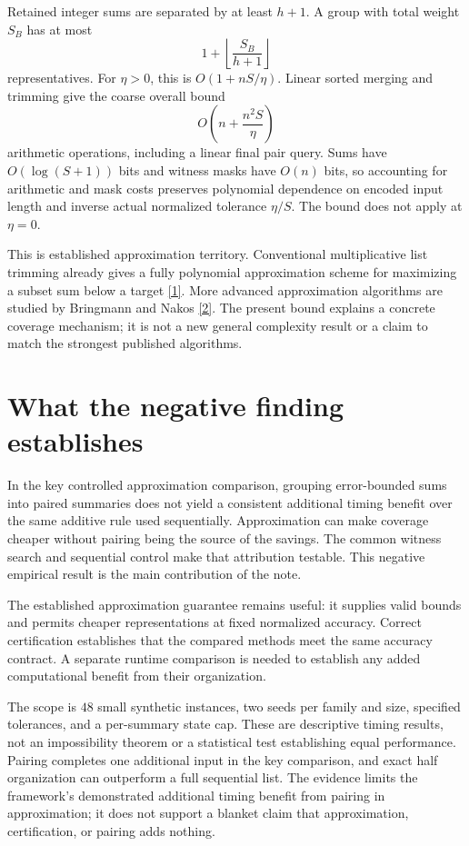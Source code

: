 \documentclass[10pt,english]{article}
\begin{document}
Retained integer sums are separated by at least \(h+1\). A group with total weight \(S_B\) has at most
\[
1+\left\lfloor\frac{S_B}{h+1}\right\rfloor
\]
representatives. For \(\eta>0\), this is \(O(1+nS/\eta)\). Linear sorted merging and trimming give the coarse overall bound
\[
O\!\left(n+\frac{n^2S}{\eta}\right)
\]
arithmetic operations, including a linear final pair query. Sums have \(O(\log(S+1))\) bits and witness masks have \(O(n)\) bits, so accounting for arithmetic and mask costs preserves polynomial dependence on encoded input length and inverse actual normalized tolerance \(\eta/S\). The bound does not apply at \(\eta=0\).

This is established approximation territory. Conventional multiplicative list trimming already gives a fully polynomial approximation scheme for maximizing a subset sum below a target \href{https://courses.grainger.illinois.edu/cs473/fa2015/w/lec/slides/10_notes.pdf}{[1]}. More advanced approximation algorithms are studied by Bringmann and Nakos \href{https://arxiv.org/abs/1912.12529}{[2]}. The present bound explains a concrete coverage mechanism; it is not a new general complexity result or a claim to match the strongest published algorithms.

\section{What the negative finding establishes}
In the key controlled approximation comparison, grouping error-bounded sums into paired summaries does not yield a consistent additional timing benefit over the same additive rule used sequentially. Approximation can make coverage cheaper without pairing being the source of the savings. The common witness search and sequential control make that attribution testable. This negative empirical result is the main contribution of the note.

The established approximation guarantee remains useful: it supplies valid bounds and permits cheaper representations at fixed normalized accuracy. Correct certification establishes that the compared methods meet the same accuracy contract. A separate runtime comparison is needed to establish any added computational benefit from their organization.

The scope is \(48\) small synthetic instances, two seeds per family and size, specified tolerances, and a per-summary state cap. These are descriptive timing results, not an impossibility theorem or a statistical test establishing equal performance. Pairing completes one additional input in the key comparison, and exact half organization can outperform a full sequential list. The evidence limits the framework's demonstrated additional timing benefit from pairing in approximation; it does not support a blanket claim that approximation, certification, or pairing adds nothing.
\end{document}

